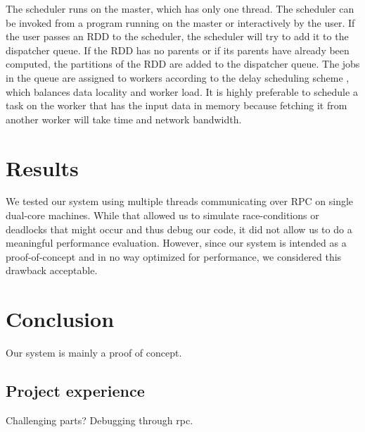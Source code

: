 \documentclass[10pt]{article}
\begin{document}
The scheduler runs on the master, which has only one thread. The scheduler can be invoked from a program running on the master or interactively by the user. If the user passes an RDD to the scheduler, the scheduler will try to add it to the dispatcher queue. If the RDD has no parents or if its parents have already been computed, the partitions of the RDD are added to the dispatcher queue. The jobs in the queue are assigned to workers according to the delay scheduling scheme \cite{delay}, which balances data locality and worker load. It is highly preferable to schedule a task on the worker that has the input data in memory because fetching it from another worker will take time and network bandwidth.

\section*{Results}
We tested our system using multiple threads communicating over RPC on single dual-core machines. While that allowed us to simulate race-conditions or deadlocks that might occur and thus debug our code, it did not allow us to do a meaningful performance evaluation. However, since our system is intended as a proof-of-concept and in no way optimized for performance, we considered this drawback acceptable.

\section*{Conclusion}
Our system is mainly a proof of concept. 

\subsection*{Project experience}
Challenging parts? Debugging through rpc.






\end{document}
